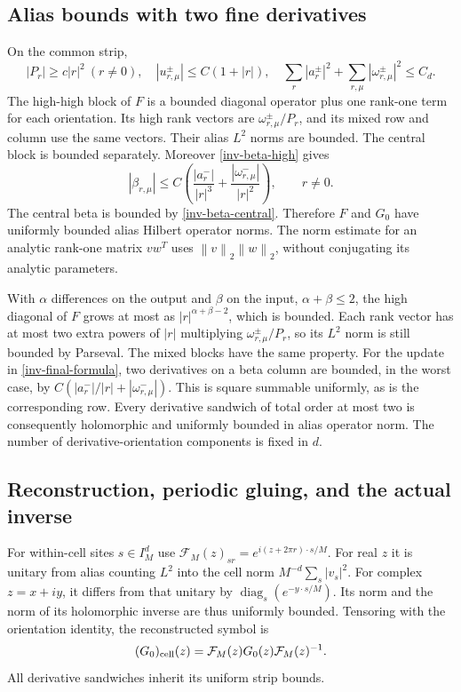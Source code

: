 \documentclass[11pt]{article}
\theoremstyle{remark}
\newcommand{\norm}[1]{\left\|#1\right\|}
\newcommand{\diag}{\operatorname{diag}}
\begin{document}
\subsection{Alias bounds with two fine derivatives}

On the common strip,
\[
 |P_r|\ge c|r|^2\ (r\ne0),\quad
 |u_{r,\mu}^{\pm}|\le C(1+|r|),\quad
 \sum_r|a_r^\pm|^2+
       \sum_{r,\mu}|\omega_{r,\mu}^\pm|^2\le C_d.
\]
The high-high block of $F$ is a bounded diagonal operator plus one
rank-one term for each orientation. Its high rank vectors are
$\omega_{r,\mu}^{\pm}/P_r$, and its mixed row and column use the
same vectors. Their alias $L^2$ norms are bounded. The central block
is bounded separately. Moreover \eqref{inv-beta-high} gives
\begin{equation}\label{inv-beta-estimate}
 |\beta_{r,\mu}|\le
 C\left(\frac{|a_r^-|}{|r|^3}
             +\frac{|\omega_{r,\mu}^-|}{|r|^2}\right),\qquad r\ne0.
\end{equation}
The central beta is bounded by \eqref{inv-beta-central}.
Therefore $F$ and $G_0$ have uniformly bounded alias Hilbert operator
norms. The norm estimate for an analytic rank-one matrix $v w^T$
uses $\norm{v}_2\norm{w}_2$, without conjugating its analytic parameters.

With $\alpha$ differences on the output and $\beta$ on the input,
$\alpha+\beta\le2$, the high diagonal of $F$ grows at most as
$|r|^{\alpha+\beta-2}$, which is bounded. Each rank vector has at
most two extra powers of $|r|$ multiplying
$\omega_{r,\mu}^{\pm}/P_r$, so its $L^2$ norm is still bounded by
Parseval. The mixed blocks have the same property. For the update in
\eqref{inv-final-formula}, two derivatives on a beta column are bounded,
in the worst case, by $C(|a_r^-|/|r|+|\omega_{r,\mu}^-|)$.
This is square summable uniformly, as is the corresponding row.
Every derivative sandwich of total order at most two is consequently
holomorphic and uniformly bounded in alias operator norm. The number
of derivative-orientation components is fixed in $d$.

\subsection{Reconstruction, periodic gluing, and the actual inverse}

For within-cell sites $s\in I_M^d$ use
$\mathcal F_M(z)_{sr}=e^{i(z+2\pi r)\cdot s/M}$.
For real $z$ it is unitary from alias counting $L^2$ into the cell
norm $M^{-d}\sum_s|v_s|^2$. For complex $z=x+iy$, it differs from
that unitary by $\diag_s(e^{-y\cdot s/M})$. Its norm and the norm of
its holomorphic inverse are thus uniformly bounded. Tensoring with
the orientation identity, the reconstructed symbol is
\[
 (G_0)_{\rm cell}(z)=\mathcal F_M(z)G_0(z)\mathcal F_M(z)^{-1}.
\]
All derivative sandwiches inherit its uniform strip bounds.
\end{document}
